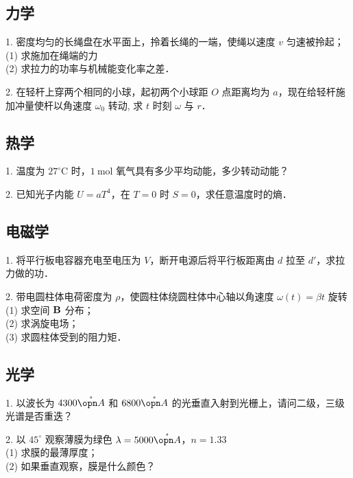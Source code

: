 \subsection{力学}
1. 密度均匀的长绳盘在水平面上，拎着长绳的一端，使绳以速度 $v$ 匀速被拎起；\\
(1) 求施加在绳端的力\\
(2) 求拉力的功率与机械能变化率之差．

2. 在轻杆上穿两个相同的小球，起初两个小球距 $O$ 点距离均为 $a$，现在给轻杆施加冲量使杆以角速度 $\omega_{0}$ 转动, 求 $t$ 时刻 $\omega$ 与 $r$．
\subsection{热学}
1. 温度为 $27^{\circ} \mathrm{C}$ 时，$1 \mathrm{~mol}$ 氧气具有多少平均动能，多少转动动能？

2. 已知光子内能 $U=a T^{4}$，在 $T=0$ 时 $S=0$，求任意温度时的熵．
\subsection{电磁学}
1. 将平行板电容器充电至电压为 $V$，断开电源后将平行板距离由 $d$ 拉至 $d'$，求拉力做的功．

2. 带电圆柱体电荷密度为 $\rho$，使圆柱体绕圆柱体中心轴以角速度 $\omega(t)=\beta t$ 旋转\\
(1) 求空间 $\bf{B}$ 分布；\\
(2) 求涡旋电场；\\
(3) 求圆柱体受到的阻力矩．
\subsection{光学}
1. 以波长为 $4300 \mathring{\opn A}$ 和 $6800 \mathring{\opn A}$ 的光垂直入射到光栅上，请问二级，三级光谱是否重迭？

2. 以 $45^{\circ}$ 观察薄膜为绿色 $\lambda=5000 \mathring{\opn A}$，$n=1.33$\\
(1) 求膜的最薄厚度；\\
(2) 如果垂直观察，膜是什么颜色？